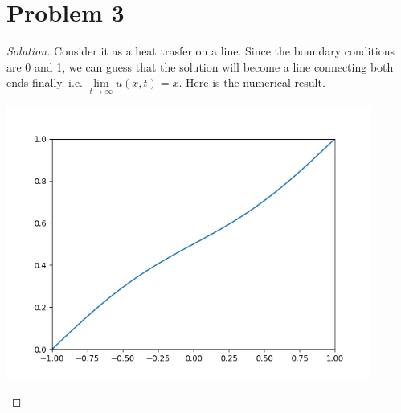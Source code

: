 \section*{Problem 3}
	\begin{proof} [Solution]
		Consider it as a heat trasfer on a line. Since the boundary conditions are 0 and 1, we can guess that the solution will become a line connecting both ends finally. i.e. $\lim\limits_{t\rightarrow\infty}u(x, t) = x$. Here is the numerical result.
		\begin{center}
			\includegraphics[width=0.9\textwidth]{PDE.png}
		\end{center}
	\end{proof}